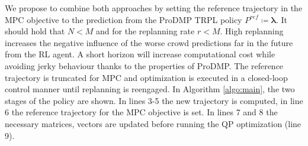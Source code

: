 \documentclass[letterpaper,conference,10pt]{IEEEconf}
\begin{document}
We propose to combine both approaches by setting the reference trajectory in the MPC objective to the prediction from the ProDMP TRPL policy $P^{ref}\coloneqq \boldsymbol{\lambda}$. It should hold that $N<M$ and for the replanning rate $r<M$. High replanning increases the negative influence of the worse crowd predictions far in the future from the RL agent. A short horizon will increase computational cost while avoiding jerky behaviour thanks to the properties of ProDMP. The reference trajectory is truncated for MPC and optimization is executed in a closed-loop control manner until replanning is reengaged. In Algorithm \ref{algo:main}, the two stages of the policy are shown. In lines 3-5 the new trajectory is computed, in line 6 the reference trajectory for the MPC objective is set. In lines 7 and 8 the necessary matrices, vectors are updated before running the QP optimization (line 9).
\end{document}
